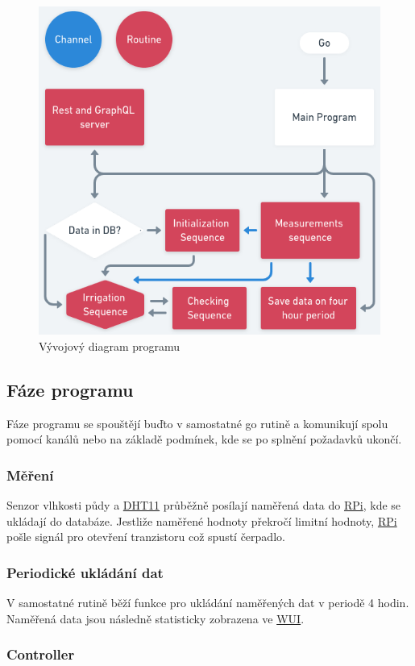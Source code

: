 \documentclass[12pt,a4paper]{article}
\begin{document}
\begin{figure}[h]
	\centering
	\includegraphics[width=0.72\linewidth]{go.png}
	\caption{Vývojový diagram programu}
\end{figure}

\subsection{Fáze programu}

Fáze programu se spouštějí buďto v samostatné go rutině a komunikují spolu pomocí kanálů nebo na základě podmínek, kde se po splnění požadavků ukončí.

\subsubsection{Měření}

Senzor vlhkosti půdy a \underline{\ac{DHT11}} průběžně posílají naměřená data do \underline{\ac{RPi}}, kde se ukládají do databáze. Jestliže naměřené hodnoty překročí limitní hodnoty, \underline{\ac{RPi}} pošle signál pro otevření tranzistoru což spustí čerpadlo.


\subsubsection{Periodické ukládání dat}

V samostatné rutině běží funkce pro ukládání naměřených dat v periodě 4 hodin. Naměřená data jsou následně statisticky zobrazena ve \underline{\ac{WUI}}.

\subsubsection{Controller}
\end{document}

